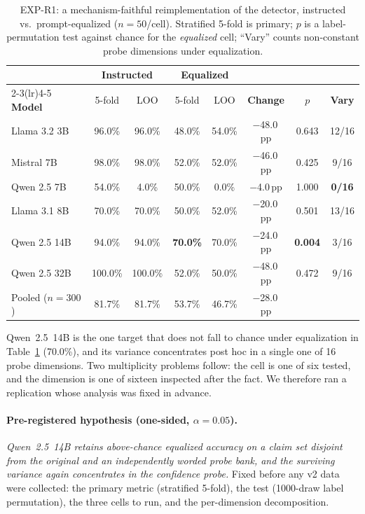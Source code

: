 \begin{table}[h]
\centering
\small
\setlength{\tabcolsep}{4pt}
\caption{EXP-R1: a mechanism-faithful reimplementation of the \citet{pacchiardi2024catch} detector, instructed vs.\ prompt-equalized ($n{=}50$/cell). Stratified 5-fold is primary; $p$ is a label-permutation test against chance for the \emph{equalized} cell; ``Vary'' counts non-constant probe dimensions under equalization.}
\label{tab:r1_faithful}
\begin{tabular}{lccccccc}
\toprule
& \multicolumn{2}{c}{\textbf{Instructed}} & \multicolumn{2}{c}{\textbf{Equalized}} & & & \\
\cmidrule(lr){2-3}\cmidrule(lr){4-5}
\textbf{Model} & 5-fold & LOO & 5-fold & LOO & \textbf{Change} & \textbf{$p$} & \textbf{Vary} \\
\midrule
Llama 3.2 3B    & 96.0\%  & 96.0\%  & 48.0\% & 54.0\% & $-$48.0\,pp & 0.643 & 12/16 \\
Mistral 7B      & 98.0\%  & 98.0\%  & 52.0\% & 52.0\% & $-$46.0\,pp & 0.425 & 9/16 \\
Qwen 2.5 7B     & 54.0\%  & \phantom{0}4.0\% & 50.0\% & \phantom{0}0.0\% & $-$4.0\,pp & 1.000 & \textbf{0/16} \\
Llama 3.1 8B    & 70.0\%  & 70.0\%  & 50.0\% & 52.0\% & $-$20.0\,pp & 0.501 & 13/16 \\
Qwen 2.5 14B    & 94.0\%  & 94.0\%  & \textbf{70.0\%} & 70.0\% & $-$24.0\,pp & \textbf{0.004} & 3/16 \\
Qwen 2.5 32B    & 100.0\% & 100.0\% & 52.0\% & 50.0\% & $-$48.0\,pp & 0.472 & 9/16 \\
\midrule
Pooled ($n{=}300$) & 81.7\% & 81.7\% & 53.7\% & 46.7\% & $-$28.0\,pp & & \\
\bottomrule
\end{tabular}
\end{table}



Qwen~2.5~14B is the one target that does not fall to chance under equalization in Table~\ref{tab:r1_faithful} (70.0\%), and its variance concentrates post hoc in a single one of 16 probe dimensions. Two multiplicity problems follow: the cell is one of six tested, and the dimension is one of sixteen inspected after the fact. We therefore ran a replication whose analysis was fixed in advance.

\paragraph{Pre-registered hypothesis (one-sided, $\alpha=0.05$).} \emph{Qwen~2.5~14B retains above-chance equalized accuracy on a claim set disjoint from the original and an independently worded probe bank, and the surviving variance again concentrates in the confidence probe.} Fixed before any v2 data were collected: the primary metric (stratified 5-fold), the test (1000-draw label permutation), the three cells to run, and the per-dimension decomposition.

